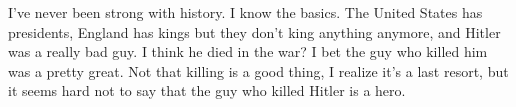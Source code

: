 \item I've never been strong with history. I know the basics. The United States has presidents, England has kings but they don't king anything anymore, and Hitler was a really bad guy. I think he died in the war? I bet the guy who killed him was a pretty great. Not that killing is a good thing, I realize it's a last resort, but it seems hard not to say that the guy who killed Hitler is a hero.